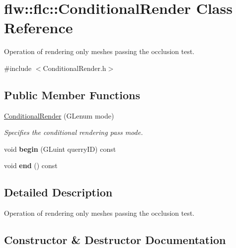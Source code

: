 \hypertarget{classflw_1_1flc_1_1ConditionalRender}{}\section{flw\+:\+:flc\+:\+:Conditional\+Render Class Reference}
\label{classflw_1_1flc_1_1ConditionalRender}


Operation of rendering only meshes passing the occlusion test.  




{\ttfamily \#include $<$Conditional\+Render.\+h$>$}

\subsection*{Public Member Functions}
\begin{DoxyCompactItemize}
\item 
\hyperlink{classflw_1_1flc_1_1ConditionalRender_aaa7bf9c82c8631afea3e70fa164be287}{Conditional\+Render} (G\+Lenum mode)
\begin{DoxyCompactList}\small\item\em Specifies the conditional rendering pass mode. \end{DoxyCompactList}\item 
\mbox{\label{classflw_1_1flc_1_1ConditionalRender_a1984746db772499252610048699e8d67}} 
void {\bfseries begin} (G\+Luint querry\+ID) const
\item 
\mbox{\label{classflw_1_1flc_1_1ConditionalRender_add55234ea412029c9225b20bf5ad6618}} 
void {\bfseries end} () const
\end{DoxyCompactItemize}


\subsection{Detailed Description}
Operation of rendering only meshes passing the occlusion test. 

\subsection{Constructor \& Destructor Documentation}
\mbox{\label{classflw_1_1flc_1_1ConditionalRender_aaa7bf9c82c8631afea3e70fa164be287}} 
